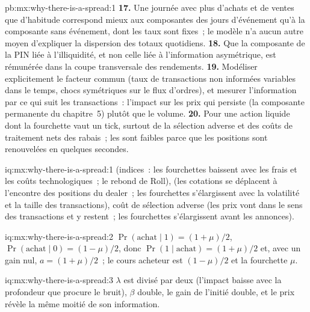 \begin{solution}{pb:mx:why-there-is-a-spread:1}
\textbf{17.} Une journée avec plus d'achats et de ventes que d'habitude correspond mieux aux composantes des jours d'événement qu'à la composante sans événement, dont les taux sont fixes~; le modèle
n'a aucun autre moyen d'expliquer la dispersion des totaux quotidiens.
\textbf{18.} Que la composante de la PIN liée à l'illiquidité, et non celle liée à l'information asymétrique, est rémunérée dans la coupe transversale des rendements.
\textbf{19.} Modéliser explicitement le facteur commun (taux de transactions non informées variables dans le temps, chocs symétriques sur le flux d'ordres), et mesurer l'information par ce qui suit
les transactions~: l'impact sur les prix qui persiste (la composante permanente du chapitre~5) plutôt que le volume.
\textbf{20.} Pour une action liquide dont la fourchette vaut un tick, surtout de la sélection adverse et des coûts de traitement nets des rabais~; les  sont faibles parce que
les positions sont renouvelées en quelques secondes.
\end{solution}

\begin{solution}{iq:mx:why-there-is-a-spread:1}
 (indices~: les fourchettes baissent avec les frais et les coûts technologiques~; le rebond de Roll),  (les cotations se déplacent à l'encontre des positions du dealer~; les fourchettes s'élargissent
avec la volatilité et la taille des transactions), coût de sélection adverse (les prix vont dans le sens des transactions et y restent~; les fourchettes s'élargissent avant les annonces).
\end{solution}

\begin{solution}{iq:mx:why-there-is-a-spread:2}
$\Pr(\text{achat}\mid1)=(1+\mu)/2$, $\Pr(\text{achat}\mid0)=(1-\mu)/2$, donc $\Pr(1\mid\text{achat})=(1+\mu)/2$ et, avec un gain nul, $a=(1+\mu)/2$~; le cours acheteur est
$(1-\mu)/2$ et la fourchette $\mu$. 
\end{solution}

\begin{solution}{iq:mx:why-there-is-a-spread:3}
$\lambda$ est divisé par deux (l'impact baisse avec la profondeur que procure le bruit), $\beta$ double, le gain de l'initié double, et le prix révèle la même moitié de son
information. 
\end{solution}

